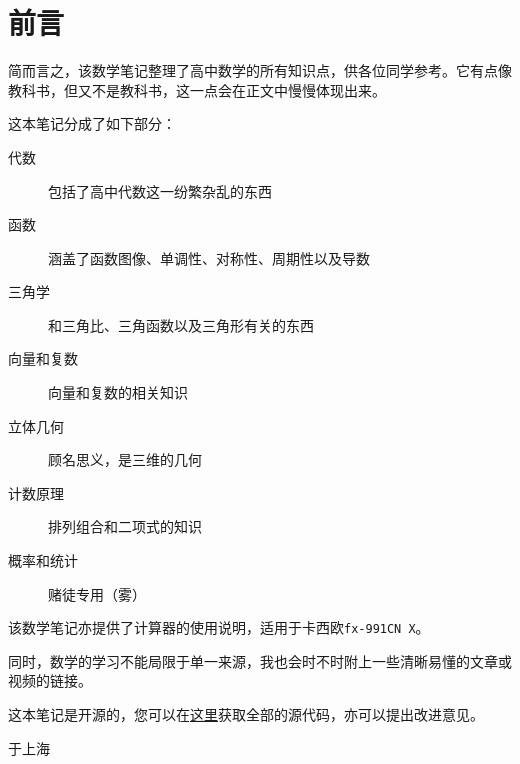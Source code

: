 \section*{前言}
简而言之，该数学笔记整理了高中数学的所有知识点，供各位同学参考。它有点像教科书，但又不是教科书，这一点会在正文中慢慢体现出来。

这本笔记分成了如下部分：

\begin{description}
	\item[代数] 包括了高中代数这一纷繁杂乱的东西
	\item[函数] 涵盖了函数图像、单调性、对称性、周期性以及导数
	\item[三角学] 和三角比、三角函数以及三角形有关的东西
	\item[向量和复数] 向量和复数的相关知识
	\item[立体几何] 顾名思义，是三维的几何
	\item[计数原理] 排列组合和二项式的知识
	\item[概率和统计] 赌徒专用（雾）
\end{description}

该数学笔记亦提供了计算器的使用说明，适用于卡西欧\verb|fx-991CN X|。

同时，数学的学习不能局限于单一来源，我也会时不时附上一些清晰易懂的文章或视频的链接。

这本笔记是开源的，您可以在\href{https://github.com/jason-bowen-zheng/math-notes}{这里}获取全部的源代码，亦可以提出改进意见。
\hypersetup{hidelinks}

\begin{flushright}
	\date{2022年11月}于上海
\end{flushright}
